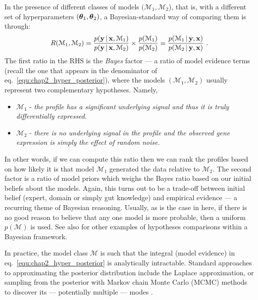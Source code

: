       In the presence of different classes of models $(\mathcal{M}_1, \mathcal{M}_2$), 
      that is, with a different set of hyperparameters $(\boldsymbol{\theta}_1, \boldsymbol{\theta}_2)$, a Bayesian-standard way of comparing them
      is through:
      \begin{align} \label{equ:chap2_BayesFactor}
	R(\mathcal{M}_1, \mathcal{M}_2)
	  = \frac{ p(\mathbf{y} \,|\, \mathbf{x}, \mathcal{M}_1) }{ p(\mathbf{y} \,|\, \mathbf{x}, \mathcal{M}_2) } \times
	  \frac{ p(\mathcal{M}_1) }{ p(\mathcal{M}_2) }
	  = \frac{ p(\mathcal{M}_1 \,|\, \mathbf{y},\mathbf{x}) }{ p(\mathcal{M}_2 \,|\, \mathbf{y},\mathbf{x}) } ~.
      \end{align}
      The first ratio in the RHS is the \emph{Bayes} factor --- a ratio of model evidence terms (recall the one that appears in the
      denominator of eq.~\eqref{equ:chap2_hyper_posterior}),
      where the models $(\mathcal{M}_1, \mathcal{M}_2)$ usually represent two complementary hypotheses.
      Namely,
      \begin{itemize}
	\item $\mathcal{M}_1$ - \textit{the profile has a significant underlying
	  signal and thus it is truly differentially expressed}.
	\item $\mathcal{M}_2$ - \textit{there is no underlying signal in the profile and
	  the observed gene expression is simply the effect of random noise.}
      \end{itemize}
      In other words, if we can compute this ratio then we can rank the profiles
      based on how likely it is that model $\mathcal{M}_1$ generated the data relative to $\mathcal{M}_2$.
      The second factor is a ratio of model priors which weighs the Bayes ratio based on our initial beliefs about the models.
      Again, this turns out to be a trade-off between initial belief (expert, domain or simply gut knowledge) and empirical 
      evidence ---  a recurring theme of Bayesian reasoning. Usually, as is the case in here, if there is no good reason to believe
      that any one model is more probable, then a uniform $p(\mathcal{M})$ is
      used. See also \citep{yuan2006flexible, angelini2007bayesian, stegle2010robust}
      for other examples of hypotheses comparisons within a Bayesian framework.
      
      In practice, the model class $\mathcal{M}$ is such that the integral
      (model evidence) in eq.~\eqref{equ:chap2_hyper_posterior}
      is analytically intractable. Standard approaches to approximating the posterior distribution include the
      Laplace approximation, or sampling from the posterior with Markov chain Monte Carlo (MCMC)
      methods to discover its --- potentially multiple --- modes \citep{mackay1999comparison, Neal:monte97}.
      
